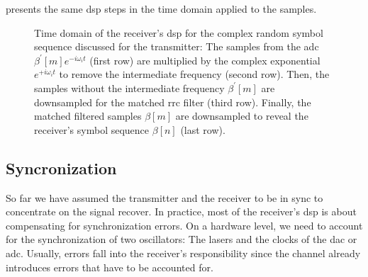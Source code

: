  presents the same \gls{dsp} steps in the time domain applied to the samples.
\begin{figure}[htb]
	\centering
	
	\caption{Time domain of the receiver's \gls{dsp} for the complex random symbol sequence discussed for the transmitter: The samples from the \gls{adc} $\beta^\prime[m]e^{-i\omega_it}$ (first row) are multiplied by the complex exponential $e^{+i\omega_it}$ to remove the intermediate frequency (second row). Then, the samples without the intermediate frequency $\beta^\prime[m]$ are downsampled for the matched \gls{rrc} filter (third row). Finally, the matched filtered samples $\beta[m]$ are downsampled to reveal the receiver's symbol sequence $\beta[n]$ (last row).}\label{fig:receiver_time}
\end{figure}

\FloatBarrier
\subsection{Syncronization}


So far we have assumed the transmitter and the receiver to be in sync to concentrate on the signal recover.
In practice, most of the receiver's \gls{dsp} is about compensating for synchronization errors.
On a hardware level, we need to account for the synchronization of two oscillators:
The lasers and the clocks of the \gls{dac} or \gls{adc}.
Usually, errors fall into the receiver's responsibility since the channel already introduces errors that have to be accounted for.

